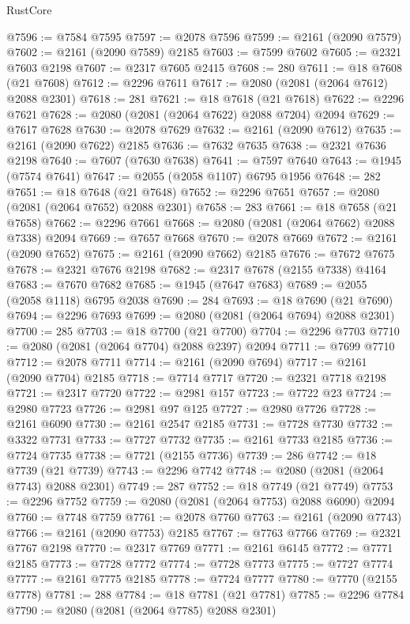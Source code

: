 \begin{lexlean}{RustCore}
\begin{coremodule}
@7596 := @7584 @7595
@7597 := @2078 @7596
@7599 := @2161 (@2090 @7579)
@7602 := @2161 (@2090 @7589) @2185
@7603 := @7599 @7602
@7605 := @2321 @7603 @2198
@7607 := @2317 @7605 @2415
@7608 := 280
@7611 := @18 @7608 (@21 @7608)
@7612 := @2296 @7611
@7617 := @2080 (@2081 (@2064 @7612) @2088 @2301)
@7618 := 281
@7621 := @18 @7618 (@21 @7618)
@7622 := @2296 @7621
@7628 := @2080 (@2081 (@2064 @7622) @2088 @7204) @2094
@7629 := @7617 @7628
@7630 := @2078 @7629
@7632 := @2161 (@2090 @7612)
@7635 := @2161 (@2090 @7622) @2185
@7636 := @7632 @7635
@7638 := @2321 @7636 @2198
@7640 := @7607 (@7630 @7638)
@7641 := @7597 @7640
@7643 := @1945 (@7574 @7641)
@7647 := @2055 (@2058 @1107) @6795 @1956
@7648 := 282
@7651 := @18 @7648 (@21 @7648)
@7652 := @2296 @7651
@7657 := @2080 (@2081 (@2064 @7652) @2088 @2301)
@7658 := 283
@7661 := @18 @7658 (@21 @7658)
@7662 := @2296 @7661
@7668 := @2080 (@2081 (@2064 @7662) @2088 @7338) @2094
@7669 := @7657 @7668
@7670 := @2078 @7669
@7672 := @2161 (@2090 @7652)
@7675 := @2161 (@2090 @7662) @2185
@7676 := @7672 @7675
@7678 := @2321 @7676 @2198
@7682 := @2317 @7678 (@2155 @7338) @4164
@7683 := @7670 @7682
@7685 := @1945 (@7647 @7683)
@7689 := @2055 (@2058 @1118) @6795 @2038
@7690 := 284
@7693 := @18 @7690 (@21 @7690)
@7694 := @2296 @7693
@7699 := @2080 (@2081 (@2064 @7694) @2088 @2301)
@7700 := 285
@7703 := @18 @7700 (@21 @7700)
@7704 := @2296 @7703
@7710 := @2080 (@2081 (@2064 @7704) @2088 @2397) @2094
@7711 := @7699 @7710
@7712 := @2078 @7711
@7714 := @2161 (@2090 @7694)
@7717 := @2161 (@2090 @7704) @2185
@7718 := @7714 @7717
@7720 := @2321 @7718 @2198
@7721 := @2317 @7720
@7722 := @2981 @157
@7723 := @7722 @23
@7724 := @2980 @7723
@7726 := @2981 @97 @125
@7727 := @2980 @7726
@7728 := @2161 @6090
@7730 := @2161 @2547 @2185
@7731 := @7728 @7730
@7732 := @3322 @7731
@7733 := @7727 @7732
@7735 := @2161 @7733 @2185
@7736 := @7724 @7735
@7738 := @7721 (@2155 @7736)
@7739 := 286
@7742 := @18 @7739 (@21 @7739)
@7743 := @2296 @7742
@7748 := @2080 (@2081 (@2064 @7743) @2088 @2301)
@7749 := 287
@7752 := @18 @7749 (@21 @7749)
@7753 := @2296 @7752
@7759 := @2080 (@2081 (@2064 @7753) @2088 @6090) @2094
@7760 := @7748 @7759
@7761 := @2078 @7760
@7763 := @2161 (@2090 @7743)
@7766 := @2161 (@2090 @7753) @2185
@7767 := @7763 @7766
@7769 := @2321 @7767 @2198
@7770 := @2317 @7769
@7771 := @2161 @6145
@7772 := @7771 @2185
@7773 := @7728 @7772
@7774 := @7728 @7773
@7775 := @7727 @7774
@7777 := @2161 @7775 @2185
@7778 := @7724 @7777
@7780 := @7770 (@2155 @7778)
@7781 := 288
@7784 := @18 @7781 (@21 @7781)
@7785 := @2296 @7784
@7790 := @2080 (@2081 (@2064 @7785) @2088 @2301)

\end{coremodule}
\end{lexlean}
